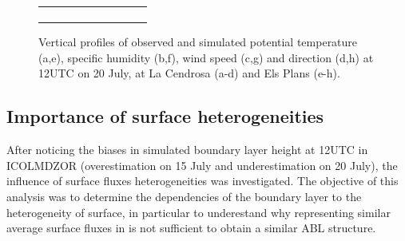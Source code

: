 \begin{figure}[hbtp]
{\begin{tabular}{@{}cccc@{}}
\begin{subfigure}[t]{0.283\textwidth}
        \end{subfigure} \\
    \end{tabular}
    }
    \caption{Vertical profiles of observed and simulated potential temperature (a,e), specific humidity (b,f), wind speed (c,g) and direction (d,h) at 12UTC on 20 July, at La Cendrosa (a-d) and Els Plans (e-h).}
    \label{fig:profiles_cendrosa_2007}
\end{figure}

\clearpage

\subsection{Importance of surface heterogeneities}
\label{sec:heterogeneities}

After noticing the biases in simulated boundary layer height at 12UTC in ICOLMDZOR (overestimation on 15 July and underestimation on 20 July), the influence of surface fluxes heterogeneities was investigated.
The objective of this analysis was to determine the dependencies of the \mesomean boundary layer to the heterogeneity of surface, in particular to underestand why representing similar average surface fluxes in \irrboost is not sufficient to obtain a similar ABL structure.



